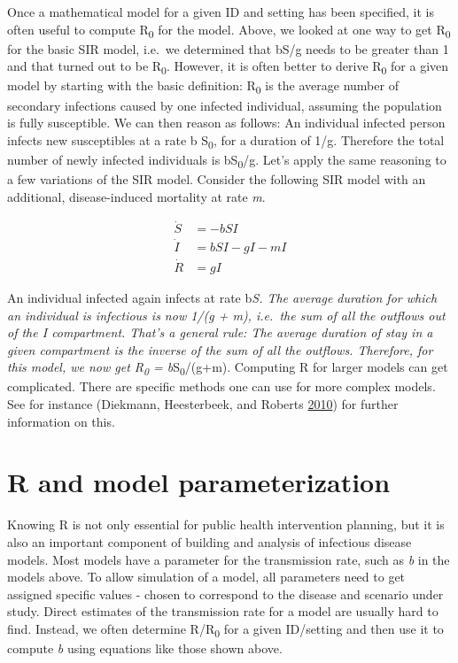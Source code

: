 \documentclass[]{book}
\theoremstyle{definition}
\theoremstyle{definition}
\theoremstyle{definition}
\theoremstyle{remark}
\begin{document}
Once a mathematical model for a given ID and setting has been specified,
it is often useful to compute R\textsubscript{0} for the model. Above,
we looked at one way to get R\textsubscript{0} for the basic SIR model,
i.e.~we determined that bS/g needs to be greater than 1 and that turned
out to be R\textsubscript{0}. However, it is often better to derive
R\textsubscript{0} for a given model by starting with the basic
definition: R\textsubscript{0} is the average number of secondary
infections caused by one infected individual, assuming the population is
fully susceptible. We can then reason as follows: An individual infected
person infects new susceptibles at a rate b S\textsubscript{0}, for a
duration of 1/g. Therefore the total number of newly infected
individuals is bS\textsubscript{0}/g. Let's apply the same reasoning to
a few variations of the SIR model. Consider the following SIR model with
an additional, disease-induced mortality at rate \emph{m}.

\[ 
\begin{aligned}
\dot S &= -b SI \\
\dot I &= b S I - g I - m I\\
\dot R &= g I
\end{aligned}
\]

An individual infected again infects at rate b\emph{S. The average
duration for which an individual is infectious is now 1/(g + m),
i.e.~the sum of all the outflows out of the \emph{I} compartment. That's
a general rule: The average duration of stay in a given compartment is
the inverse of the sum of all the outflows. Therefore, for this model,
we now get R\textsubscript{0} = b}S\textsubscript{0}/(g+m). Computing R
for larger models can get complicated. There are specific methods one
can use for more complex models. See for instance (Diekmann,
Heesterbeek, and Roberts \protect\hyperlink{ref-diekmann10}{2010}) for
further information on this.

\hypertarget{r-and-model-parameterization}{%
\section{R and model
parameterization}\label{r-and-model-parameterization}}

Knowing R is not only essential for public health intervention planning,
but it is also an important component of building and analysis of
infectious disease models. Most models have a parameter for the
transmission rate, such as \emph{b} in the models above. To allow
simulation of a model, all parameters need to get assigned specific
values - chosen to correspond to the disease and scenario under study.
Direct estimates of the transmission rate for a model are usually hard
to find. Instead, we often determine R/R\textsubscript{0} for a given
ID/setting and then use it to compute \emph{b} using equations like
those shown above.
\end{document}
